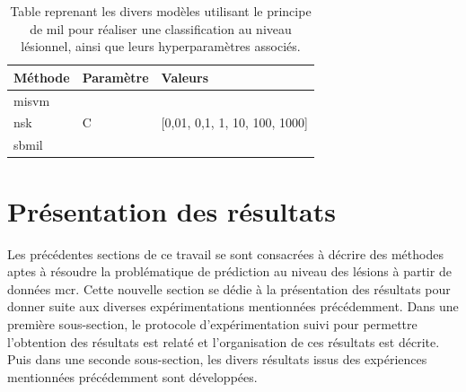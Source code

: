 \begin{table}[H]
    \centering
    \begin{tabular}{lll}
    \toprule
    \textbf{Méthode}    & \textbf{Paramètre}& \textbf{Valeurs}                                  \\ \midrule
    \gls{misvm}         & \multirow{3}{*}{C}& \multirow{3}{*}{[0,01, 0,1, 1, 10, 100, 1000]}    \\ \cline{1-1}
    \gls{nsk}           &                   &                                                   \\ \cline{1-1} 
    \gls{sbmil}         &                   &                                                   \\ \bottomrule 
    \end{tabular}    
    \caption{Table reprenant les divers modèles utilisant le principe de \gls{mil} pour réaliser une classification au niveau lésionnel, ainsi que leurs hyperparamètres associés.}
    \label{tab:patient_decision_weak_hyperparameters}
\end{table}\par
\clearpage

\section{Présentation des résultats}
Les précédentes sections de ce travail se sont consacrées à décrire des méthodes aptes à résoudre la problématique de prédiction au niveau des lésions à partir de données \gls{mcr}. Cette nouvelle section se dédie à la présentation des résultats pour donner suite aux diverses expérimentations mentionnées précédemment. Dans une première sous-section, le protocole d'expérimentation suivi pour permettre l'obtention des résultats est relaté et l'organisation de ces résultats est décrite. Puis dans une seconde sous-section, les divers résultats issus des expériences mentionnées précédemment sont développées.\par

